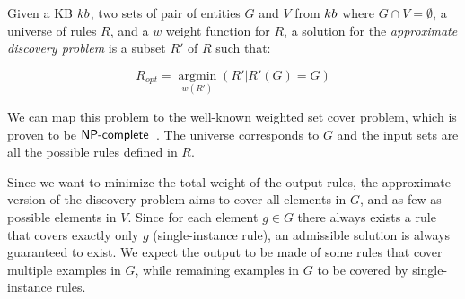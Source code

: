 \begin{definition}
	Given a KB ${\sc kb}$, two sets of pair of entities $G$ and $V$ from ${\sc kb}$ where $G \cap V = \emptyset$, a universe of rules $R$, and a $w$ weight function for $R$,
	a solution for the \emph{approximate discovery problem} is a subset $R'$ of $R$  such that:
	
	$$R_{opt}=\underset{w(R')}{\operatorname{argmin}}(R'|R'(G) = G)$$
\end{definition}

We can map this problem to the well-known weighted set cover problem, which is proven to be $\textsf{NP\mbox{-}complete}$~\cite{chvatal1979greedy}. The universe corresponds to $G$ and the input sets are all the possible rules defined in $R$.

Since we want to minimize the total weight of the output rules, the approximate version of the discovery problem aims to cover all elements in $G$, and as few as possible elements in $V$. Since for each element $g \in G$ there always exists a rule that covers exactly only $g$ (single-instance rule), an admissible solution is always guaranteed to exist. We expect the output to be made of some rules that cover multiple examples in $G$, while remaining examples in $G$ to be covered by single-instance rules. 

